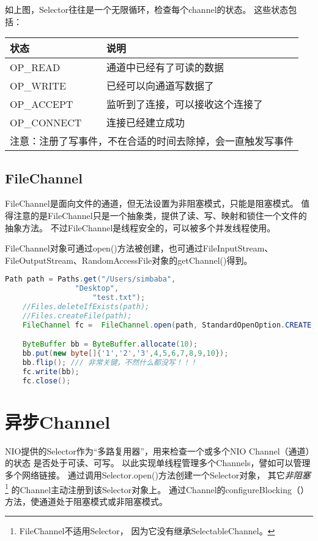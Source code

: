 
\noindent
如上图，Selector往往是一个无限循环，检查每个channel的状态。
这些状态包括：

\begin{table}[!htbp]\centering
	\begin{tabular}{|p{3cm}|p{6cm}|}
	\hline
	状态&说明\\
	\hline
	OP\_READ&通道中已经有了可读的数据\\
	OP\_WRITE&已经可以向通道写数据了\\
	OP\_ACCEPT&监听到了连接，可以接收这个连接了\\
	OP\_CONNECT&连接已经建立成功\\
	\hline
	\multicolumn{2}{|c|}{注意：注册了写事件，不在合适的时间去除掉，会一直触发写事件}\\
	\hline
	\end{tabular}
\end{table}

\subsection{FileChannel}
FileChannel是面向文件的通道，但无法设置为非阻塞模式，只能是阻塞模式。
值得注意的是FileChannel只是一个抽象类，提供了读、写、映射和锁住一个文件的抽象方法。
不过FileChannel是线程安全的，可以被多个并发线程使用。

FileChannel对象可通过open()方法被创建，也可通过FileInputStream、
FileOutputStream、RandomAccessFile对象的getChannel()得到。

\begin{lstlisting}[language=Java]
	Path path = Paths.get("/Users/simbaba",
                "Desktop",
					"test.txt");
	//Files.deleteIfExists(path);
	//Files.createFile(path);
	FileChannel fc =  FileChannel.open(path, StandardOpenOption.CREATE, StandardOpenOption.WRITE);

	ByteBuffer bb = ByteBuffer.allocate(10);
	bb.put(new byte[]{'1','2','3',4,5,6,7,8,9,10});
	bb.flip(); /// 非常关键，不然什么都没写！！！
	fc.write(bb);
	fc.close();
\end{lstlisting}

\section{异步Channel}
NIO提供的Selector作为“多路复用器”，用来检查一个或多个NIO Channel（通道）的状态
是否处于可读、可写。
以此实现单线程管理多个Channels，譬如可以管理多个网络链接。
通过调用Selector.open()方法创建一个Selector对象，
其它\emph{非阻塞}\footnote{FileChannel不适用Selector，
因为它没有继承SelectableChannel。}
的Channel主动注册到该Selector对象上。
通过Channel的configureBlocking（）方法，使通道处于阻塞模式或非阻塞模式。